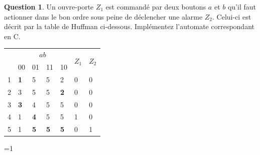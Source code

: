 \documentclass[11pt,a4paper,dvipsnames]{article}
\theoremstyle{definition}%
\newtheorem{Q}{Question}[] %
\newcommand{\reponse}[1]{%
	\ifthenelse {\boolean{corrige}} {\paragraph{Réponse :}
    \color{darkblue} #1 \color{black}} {}
 }
\newcounter{reponseCnt}
\begin{document}
\begin{Q}
	Un ouvre-porte $Z_1$ est commandé par deux boutons $a$ et $b$ qu'il faut actionner dans le bon ordre sous peine de déclencher une alarme $Z_2$.
	Celui-ci est décrit par la table de Huffman ci-dessous.
	Implémentez l'automate correspondant en C.

	\begin{center}
		\begin{tabular}{|l|l|l|l|l|l|l|} \hline
			\multirow{2}{*}{} & \multicolumn{4}{c|}{$ab$} & \multirow{2}{*}{$Z_1$} & \multirow{2}{*}{$Z_2$} \\ \cline{2-5}
			& 00 & 01 & 11 & 10 & & \\ \hline
			1 & \textbf{1} & 5 & 5 & 2 & 0 & 0 \\ \hline
			2 & 3 & 5 & 5 & \textbf{2} & 0 & 0 \\ \hline
			3 & \textbf{3} & 4 & 5 & 5 & 0 & 0 \\ \hline
			4 & 1 & \textbf{4} & 5 & 5 & 1 & 0 \\ \hline
			5 & 1 & \textbf{5} & \textbf{5} & \textbf{5} & 0 & 1 \\ \hline
		\end{tabular}
	\end{center}

\ifnum\value{reponseCnt}=1
  
\fi

\end{Q}


%


\end{document}
